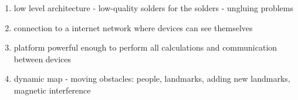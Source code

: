 \begin{enumerate}
    \item low level architecture - low-quality solders for the solders - ungluing problems
    \item connection to a internet network where devices can see themselves
    \item platform powerful enough to perform all calculations and communication between devices
    \item dynamic map - moving obstacles: people, landmarks, adding new landmarks, magnetic interference
\end{enumerate}